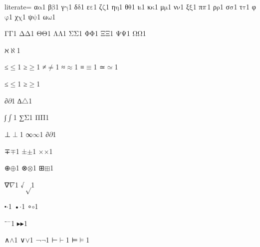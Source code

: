 {%
literate=
{α}{{\ensuremath{\mathrm{\alpha}}}}1
{β}{{\ensuremath{\mathrm{\beta}}}}1
{γ}{{\ensuremath{\mathrm{\gamma}}}}1
{δ}{{\ensuremath{\mathrm{\delta}}}}1
{ε}{{\ensuremath{\mathrm{\varepsilon}}}}1
{ζ}{{\ensuremath{\mathrm{\zeta}}}}1
{η}{{\ensuremath{\mathrm{\eta}}}}1
{θ}{{\ensuremath{\mathrm{\theta}}}}1
{ι}{{\ensuremath{\mathrm{\iota}}}}1
{κ}{{\ensuremath{\mathrm{\kappa}}}}1
{μ}{{\ensuremath{\mathrm{\mu}}}}1
{ν}{{\ensuremath{\mathrm{\nu}}}}1
{ξ}{{\ensuremath{\mathrm{\xi}}}}1
{π}{{\ensuremath{\mathrm{\mathnormal{\pi}}}}}1
{ρ}{{\ensuremath{\mathrm{\rho}}}}1
{σ}{{\ensuremath{\mathrm{\sigma}}}}1
{τ}{{\ensuremath{\mathrm{\tau}}}}1
{φ}{{\ensuremath{\mathrm{\varphi}}}}1
{χ}{{\ensuremath{\mathrm{\chi}}}}1
{ψ}{{\ensuremath{\mathrm{\psi}}}}1
{ω}{{\ensuremath{\mathrm{\omega}}}}1

{Γ}{{\ensuremath{\mathrm{\Gamma}}}}1
{Δ}{{\ensuremath{\mathrm{\Delta}}}}1
{Θ}{{\ensuremath{\mathrm{\Theta}}}}1
{Λ}{{\ensuremath{\mathrm{\Lambda}}}}1
{Σ}{{\ensuremath{\mathrm{\Sigma}}}}1
{Φ}{{\ensuremath{\mathrm{\Phi}}}}1
{Ξ}{{\ensuremath{\mathrm{\Xi}}}}1
{Ψ}{{\ensuremath{\mathrm{\Psi}}}}1
{Ω}{{\ensuremath{\mathrm{\Omega}}}}1

{ℵ}{{\ensuremath{\aleph}}}1

{≤}{{\ensuremath{\leq}}}1
{≥}{{\ensuremath{\geq}}}1
{≠}{{\ensuremath{\neq}}}1
{≈}{{\ensuremath{\approx}}}1
{≡}{{\ensuremath{\equiv}}}1
{≃}{{\ensuremath{\simeq}}}1

{≤}{{\ensuremath{\leq}}}1
{≥}{{\ensuremath{\geq}}}1

{∂}{{\ensuremath{\partial}}}1
{∆}{{\ensuremath{\triangle}}}1 %

{∫}{{\ensuremath{\int}}}1
{∑}{{\ensuremath{\mathrm{\Sigma}}}}1
{Π}{{\ensuremath{\mathrm{\Pi}}}}1

{⊥}{{\ensuremath{\perp}}}1
{∞}{{\ensuremath{\infty}}}1
{∂}{{\ensuremath{\partial}}}1

{∓}{{\ensuremath{\mp}}}1
{±}{{\ensuremath{\pm}}}1
{×}{{\ensuremath{\times}}}1

{⊕}{{\ensuremath{\oplus}}}1
{⊗}{{\ensuremath{\otimes}}}1
{⊞}{{\ensuremath{\boxplus}}}1

{∇}{{\ensuremath{\nabla}}}1
{√}{{\ensuremath{\sqrt}}}1

{⬝}{{\ensuremath{\cdot}}}1
{•}{{\ensuremath{\cdot}}}1
{∘}{{\ensuremath{\circ}}}1

{⁻}{{\ensuremath{^{-}}}}1
{▸}{{\ensuremath{\blacktriangleright}}}1

{∧}{{\ensuremath{\wedge}}}1
{∨}{{\ensuremath{\vee}}}1
{¬}{{\ensuremath{\neg}}}1
{⊢}{{\ensuremath{\vdash}}}1
{⊨}{{\ensuremath{\models}}}1

}
